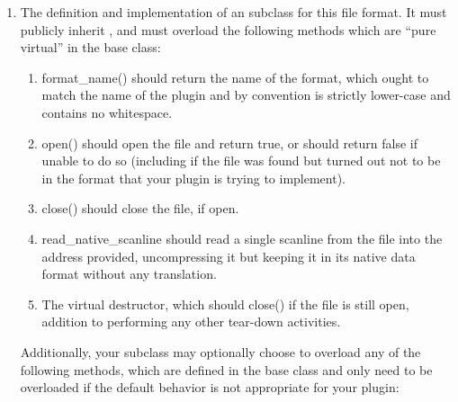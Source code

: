 \begin{enumerate}
\item The definition and implementation of an \ImageInput subclass for
  this file format.  It must publicly inherit \ImageInput, and must
  overload the following methods which are ``pure virtual'' in the
  \ImageInput base class:

  \begin{enumerate}
    \item {\cf format_name()} should return the name of the format, which
      ought to match the name of the plugin and by convention is
      strictly lower-case and contains no whitespace.
    \item {\cf open()} should open the file and return true, or should
      return false if unable to do so (including if the file was found
      but turned out not to be in the format that your plugin is trying
      to implement).
    \item {\cf close()} should close the file, if open.
    \item {\cf read_native_scanline} should read a single scanline from
      the file into the address provided, uncompressing it but
      keeping it in its native data format without any translation.
    \item The virtual destructor, which should {\cf close()} if the file
      is still open, addition to performing any other tear-down activities.
  \end{enumerate}
  
  Additionally, your \ImageInput subclass may optionally choose to
  overload any of the following methods, which are defined in the
  \ImageInput base class and only need to be overloaded if the default
  behavior is not appropriate for your plugin:


\end{enumerate}
